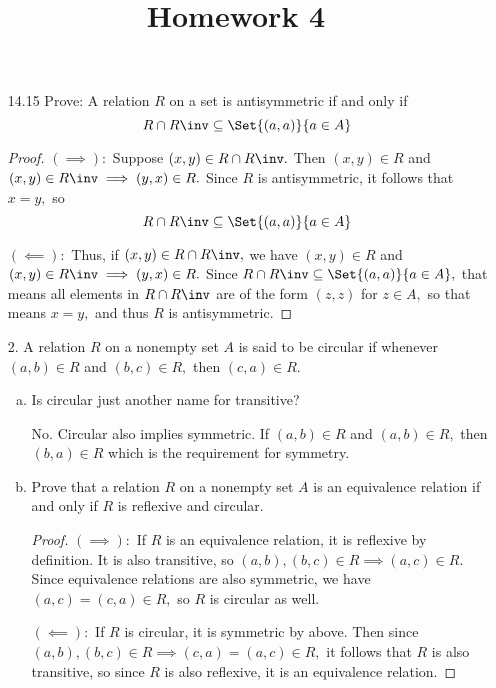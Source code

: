 \documentclass{article}
\begin{document}
\title{Homework 4}
\maketitle
\thispagestyle{fancy}

\begin{itemize}
	\item[14.15] Prove: A relation $R$ on a set is antisymmetric if and only if
		\[R\cap R\inv \subseteq \Set{(a, a)}{a\in A}\]
		\begin{proof}
			$(\implies):$ Suppose $(x, y)\in R\cap R\inv.$ Then $(x, y)\in R$ and $(x, y)\in R\inv\implies (y, x)\in R.$ Since $R$ is antisymmetric, it follows that $x=y,$ so 
			\[R\cap R\inv\subseteq \Set{(a, a)}{a\in A}\]

			$(\impliedby):$ Thus, if $(x, y)\in R\cap R\inv,$ we have $(x, y)\in R$ and $(x, y)\in R\inv\implies (y, x)\in R.$ Since $R\cap R\inv \subseteq \Set{(a, a)}{a\in A},$ that means all elements in $R\cap R\inv$ are of the form $(z, z)$ for $z\in A,$ so that means $x=y,$ and thus $R$ is antisymmetric.
		\end{proof}

	\item[2.] A relation $R$ on a nonempty set $A$ is said to be circular if whenever $(a, b)\in R$ and $(b, c)\in R,$ then $(c, a)\in R.$ 
		\begin{enumerate}[(a)]
			\item Is circular just another name for transitive?
				\begin{answer*}
					No. Circular also implies symmetric. If $(a, b)\in R$ and $(a, b)\in R,$ then $(b, a)\in R$ which is the requirement for symmetry. 
				\end{answer*}

			\item Prove that a relation $R$ on a nonempty set $A$ is an equivalence relation if and only if $R$ is reflexive and circular.
				\begin{proof}
					$(\implies):$ If $R$ is an equivalence relation, it is reflexive by definition. It is also transitive, so $(a, b), (b, c)\in R\implies (a, c)\in R.$ Since equivalence relations are also symmetric, we have $(a, c)= (c, a)\in R,$ so $R$ is circular as well.

					$(\impliedby):$ If $R$ is circular, it is symmetric by above. Then since $(a, b), (b, c)\in R\implies (c, a)=(a, c)\in R,$ it follows that $R$ is also transitive, so since $R$ is also reflexive, it is an equivalence relation.
				\end{proof}
				

\end{enumerate}
\end{itemize}
\end{document}
